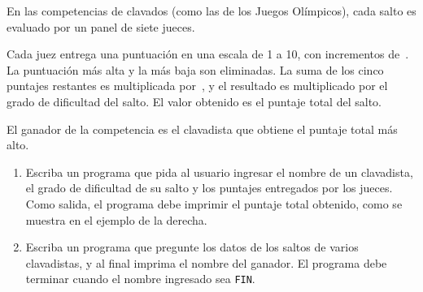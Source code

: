 En las competencias de clavados
(como las de los Juegos Olímpicos),
cada salto es evaluado
por un panel de siete jueces.

Cada juez entrega una puntuación
en una escala de 1 a 10,
con incrementos de~.
La puntuación más alta y la más baja son eliminadas.
La suma de los cinco puntajes restantes
es multiplicada por~,
y el resultado es multiplicado
por el grado de dificultad del salto.
El valor obtenido es el puntaje total del salto.

El ganador de la competencia
es el clavadista que obtiene
el puntaje total más alto.

\begin{minipage}[t]{.52\textwidth}
  \begin{enumerate}[leftmargin=0pt,label=\emph{\alph*})]
    \item
      Escriba un programa que pida al usuario
      ingresar el nombre de un clavadista,
      el grado de dificultad de su salto
      y los puntajes entregados por los jueces.
      Como salida,
      el programa debe imprimir
      el puntaje total obtenido,
      como se muestra en el ejemplo de la derecha.
    \item
      Escriba un programa que pregunte
      los datos de los saltos de varios clavadistas,
      y al final imprima el nombre del ganador.
      El programa debe terminar
      cuando el nombre ingresado sea \texttt{FIN}.
  \end{enumerate}
\end{minipage}
\hfill
\begin{minipage}[t]{.43\textwidth}
  
\end{minipage}


